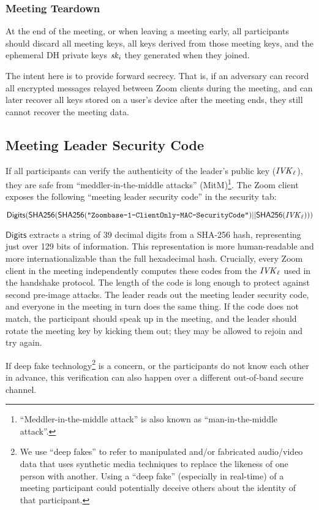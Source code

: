 \subsubsection{Meeting Teardown}
At the end of the meeting, or when leaving a meeting early, all participants should discard all meeting keys, all keys derived from those meeting keys, and the ephemeral DH private keys $\mathit{sk}_i$ they generated when they joined.

The intent here is to provide forward secrecy. That is, if an adversary can record all encrypted messages relayed between Zoom clients during the meeting, and can later recover all keys stored on a user's device after the meeting ends, they still cannot recover the meeting data.

\subsection{Meeting Leader Security Code}
If all participants can verify the authenticity of the leader's public key ($\mathit{IVK}_{\ell}$), they are safe from ``meddler-in-the-middle attacks'' (MitM)\footnote{``Meddler-in-the-middle attack'' is also known as ``man-in-the-middle attack''.}. The Zoom client exposes the following ``meeting leader security code'' in the security tab:

$$\mathsf{Digits}({\sf SHA256}({\sf SHA256}(\texttt{"Zoombase-1-ClientOnly-MAC-SecurityCode"}) || {\sf SHA256}(\mathit{IVK}_{\ell})))$$

$\mathsf{Digits}$ extracts a string of 39 decimal digits from a SHA-256 hash, representing just over 129 bits of information. This representation is more human-readable and more internationalizable than the full hexadecimal hash. Crucially, every Zoom client in the meeting independently computes these codes from the $\mathit{IVK}_{\ell}$ used in the handshake protocol. The length of the code is long enough to protect against second pre-image attacks. The leader reads out the meeting leader security code, and everyone in the meeting in turn does the same thing. If the code does not match, the participant should speak up in the meeting, and the leader should rotate the meeting key by kicking them out; they may be allowed to rejoin and try again.

If deep fake technology\footnote{We use ``deep fakes'' to refer to manipulated and/or fabricated audio/video data that uses synthetic media techniques to replace the likeness of one person with another. Using a ``deep fake'' (especially in real-time) of a meeting participant could potentially deceive others about the identity of that participant.} is a concern, or the participants do not know each other in advance, this verification can also happen over a different out-of-band secure channel.

